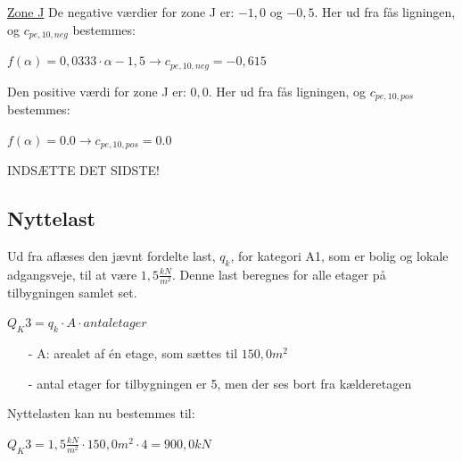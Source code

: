 \underline{Zone J}
\newline
De negative værdier for zone J er: $-1,\!0$ og $-0,\!5$. Her ud fra fås ligningen, og $c_{pe,10,neg}$ bestemmes:
\begin{center}
	$f(\alpha)=0,\!0333\cdot \alpha - 1,\!5 \to c_{pe,10,neg}=-0,\!615$
\end{center}
Den positive værdi for zone J er: $0,\!0$. Her ud fra fås ligningen, og $c_{pe,10,pos}$ bestemmes:
\begin{center}
	$f(\alpha)=0.0 \to c_{pe,10,pos}=0.0$
\end{center}
INDSÆTTE DET SIDSTE!

\subsection{Nyttelast}
Ud fra \citep[ tabel 6.2 kapitel 6.3.1.2]{EU91} aflæses den jævnt fordelte last, $q_k$, for kategori A1, som er bolig og lokale adgangsveje, til at være $1,\!5 \frac{kN}{m^2}$. Denne last beregnes for alle etager på tilbygningen samlet set.
\begin{center}
	$Q_K3=q_k\cdot A\cdot antal etager$
\end{center}
\begin{itemize}
	\item[-] A: arealet af én etage, som sættes til $150,\!0 m^2$
	\item[-] antal etager for tilbygningen er 5, men der ses bort fra kælderetagen
\end{itemize}
Nyttelasten kan nu bestemmes til:
\begin{center}
	$Q_K3=1,\!5 \frac{kN}{m^2}\cdot 150,\!0 m^2\cdot 4=900,\!0 kN$
\end{center}

